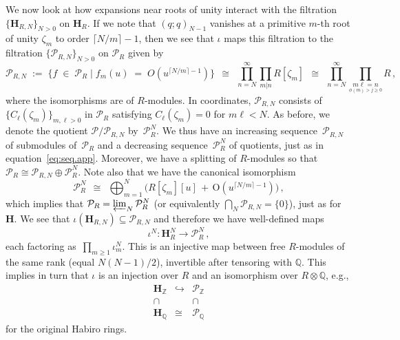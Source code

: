 \documentclass[12pt,reqno]{amsart}
\theoremstyle{definition}
\def\BZ{\mathbb Z}
\def\BQ{\mathbb Q}
\def\calP{\mathcal P}
\def\HH{\mathbf H}
\def\be{\begin{equation}}
\def\ee{\end{equation}}
\def\z{\zeta}
\def\={\;=\;}
\def\inn{\;\in\;}
\def\+{\,+\,}
\begin{document}
We now look at how expansions near roots of unity interact with
the filtration $\{\HH_{R,N}\}_{N>0}$ on $\HH_R$.
If we note that $(q;q)_{N-1}$ vanishes at a primitive $m$-th root of unity $\z_m$
to order $\lceil N/m\rceil-1$, then we see that $\iota$ maps this filtration
to the filtration $\{\calP_{R,N}\}_{N>0}$ on $\calP_R$ given by
\be
\calP_{R,N} \;:=\; \big\{f\inn\calP_R\;|\;
f_m(u)\=O(u^{\lceil N/m\rceil-1})\big\}
\,\;\cong\;\,
\prod_{n=N}^{\infty}\prod_{m|n}
R[\z_m]
\,\;\cong\;\,
\prod_{n=N}^{\infty}
\prod_{\underset{\phi(m)>j\geq0}{m\ell=n}}
R\,,
\ee
where the isomorphisms are of $R$-modules.
In coordinates, $\calP_{R,N}$ consists of $\{C_{\ell}(\z_m)\}_{m,\ell>0}$ in
$\calP_R$ satisfying $C_{\ell}(\z_m)=0$ for $m\ell<N$. As before,
we denote the quotient $\calP/\calP_{R,N}$ by~$\calP_R^{N}$. We
thus have an increasing sequence~$\calP_{R,N}$ of submodules of~$\calP_R$ and a
decreasing sequence~$\calP_R^{N}$ of quotients, just as in equation~\eqref{eq:seq.app}.
Moreover, we have a splitting of $R$-modules so
that~$\calP_R\cong\calP_{R,N}\oplus \calP_R^{N}$.
Note also that we have the canonical isomorphism
\be
\calP_R^{N}
\,\;\cong\;\,
\bigoplus_{m=1}^{N}
\big(R[\z_m][u]\+\mathrm{O}(u^{\lceil N/m\rceil-1})\big)\,,
\ee
which implies that $\calP_R = \varprojlim_{N} \calP_R^{N}$ (or equivalently
$\bigcap_N\calP_{R,N}=\{0\}$), just as for $\HH$.
We see that $\iota(\HH_{R,N})\subseteq\calP_{R,N}$ and therefore
we have well-defined maps
\be
\iota^{N}:
\HH_R^{N}\to\calP_R^{N}\,,
\ee
each factoring as~$\prod_{m\geq1}\iota_m^N$.
This is an injective map between free $R$-modules of the same rank (equal
$N(N-1)/2$), invertible after tensoring with $\BQ$. This implies in turn that
$\iota$ is an injection over $R$ and an isomorphism over $R\otimes \BQ$, e.g.,
\be
\begin{array}{ccc}
\HH_{\BZ}& \hookrightarrow
& \calP_{\BZ}\\
\cap & & \cap\\
\HH_{\BQ} & \cong & \calP_{\BQ}
\end{array}
\ee
for the original Habiro rings.
\end{document}
